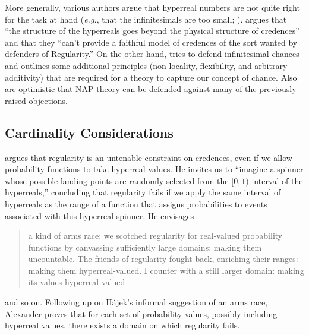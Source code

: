More generally, various authors argue that hyperreal numbers are not quite right for the task at hand (\textit{e.g.}, that the infinitesimals are too small; \citealp{Easwaran:2014,Pruss:2014}). \citet[pp.~34--35]{Easwaran:2014} argues that ``the structure of the hyperreals goes beyond the physical structure of credences'' and that they ``can't provide a faithful model of credences of the sort wanted by defenders of Regularity.''
On the other hand, \citet{Hofweber:2014} tries to defend infinitesimal chances and outlines some additional principles (non-locality, flexibility, and arbitrary additivity) that are required for a theory to capture our concept of chance. Also \citet{Benci_etal:2018} are optimistic that NAP theory can be defended against many of the previously raised objections.

\subsection{Cardinality Considerations}
\citet{Hajek:2012b} argues that regularity is an untenable constraint on credences, even if we allow probability functions to take hyperreal values. He invites us to ``imagine a spinner whose possible landing points are randomly selected from the $[0, 1)$ interval of the hyperreals,'' concluding that regularity fails if we apply the same interval of hyperreals as the range of a function that assigns probabilities to events associated with this hyperreal spinner.
He envisages
\begin{quote}
a kind of arms race: we scotched regularity for real-valued probability functions by canvassing sufficiently large domains: making them uncountable. The friends of regularity fought back, enriching their ranges: making them hyperreal-valued. I counter with a still larger domain: making its values hyperreal-valued
\end{quote}
and so on. Following up on H{\'a}jek's informal suggestion of an arms race, Alexander \citet{Pruss:2013} proves that for each set of probability values, possibly including hyperreal values, there exists a domain on which regularity fails.

